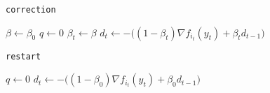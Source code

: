 \noindent%
\begin{minipage}[t]{0.49\textwidth}
\vspace{0pt}
\begin{algorithm}[H]
\caption{\texttt{correction}}\label{alg:m-correction}
$\beta\gets\beta_0$\;
$q\gets0$\;
$\beta_t\gets\beta$\;
$d_t\gets-\bigl((1-\beta_t)\nabla f_{i_t}(y_t)+\beta_td_{t-1}\bigr)$\;
\end{algorithm}
\end{minipage}%
\begin{minipage}[t]{0.49\textwidth}
\vspace{0pt}
\begin{algorithm}[H]
\caption{\texttt{restart}}\label{alg:m-restart}
$q\gets0$\;
$d_t\gets-\bigl((1-\beta_0)\nabla f_{i_t}(y_t)+\beta_0d_{t-1}\bigr)$\;
\end{algorithm}
\end{minipage}
